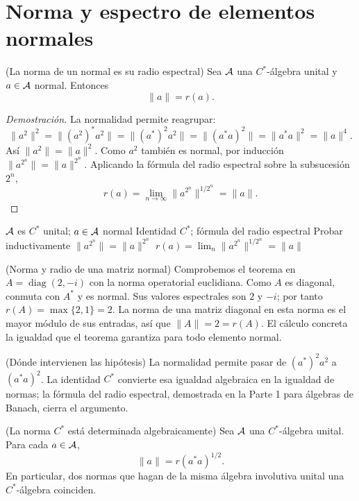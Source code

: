 \pagebreak
\section{Norma y espectro de elementos normales}

\begin{cthteorema}{(La norma de un normal es su radio espectral)}
Sea $\mathcal A$ una $C^*$-álgebra unital y $a\in\mathcal A$ normal. Entonces
\[
 \|a\|=r(a).
\]
\end{cthteorema}

\begin{proof}[Demostración]
La normalidad permite reagrupar:
\[
\|a^2\|^2
=\|(a^2)^*a^2\|
=\|(a^*)^2a^2\|
=\|(a^*a)^2\|
=\|a^*a\|^2
=\|a\|^4.
\]
Así $\|a^2\|=\|a\|^2$. Como $a^2$ también es normal, por inducción
$\|a^{2^n}\|=\|a\|^{2^n}$. Aplicando la fórmula del radio espectral sobre la subsucesión
$2^n$,
\[
 r(a)=\lim_{n\to\infty}\|a^{2^n}\|^{1/2^n}=\|a\|.
\]
\end{proof}

\proofdiagram
{$\mathcal A$ es $C^*$ unital; $a\in\mathcal A$ normal}
{Identidad $C^*$; fórmula del radio espectral}
{Probar inductivamente $\|a^{2^n}\|=\|a\|^{2^n}$}
{$r(a)=\lim_n\|a^{2^n}\|^{1/2^n}=\|a\|$}

\begin{cthejemplo}{(Norma y radio de una matriz normal)}
Comprobemos el teorema en $A=\operatorname{diag}(2,-i)$ con la
norma operatorial euclidiana. Como $A$ es diagonal, conmuta con
$A^*$ y es normal. Sus valores espectrales son $2$ y $-i$;
por tanto $r(A)=\max\{2,1\}=2$. La norma de una matriz diagonal
en esta norma es el mayor módulo de sus entradas, así que
$\|A\|=2=r(A)$. El cálculo concreta la igualdad que el teorema
garantiza para todo elemento normal.
\end{cthejemplo}

\begin{cthnota}{(Dónde intervienen las hipótesis)}
La normalidad permite pasar de $(a^*)^2a^2$ a $(a^*a)^2$.
La identidad $C^*$ convierte esa igualdad algebraica en la igualdad de normas;
la fórmula del radio espectral, demostrada en la Parte 1 para álgebras de Banach,
cierra el argumento.
\end{cthnota}


\begin{cthcorolario}{(La norma $C^*$ está determinada algebraicamente)}
Sea $\mathcal A$ una $C^*$-álgebra unital. Para cada $a\in\mathcal A$,
\[
 \|a\|=r(a^*a)^{1/2}.
\]
En particular, dos normas que hagan de la misma álgebra involutiva unital una
$C^*$-álgebra coinciden.
\end{cthcorolario}

